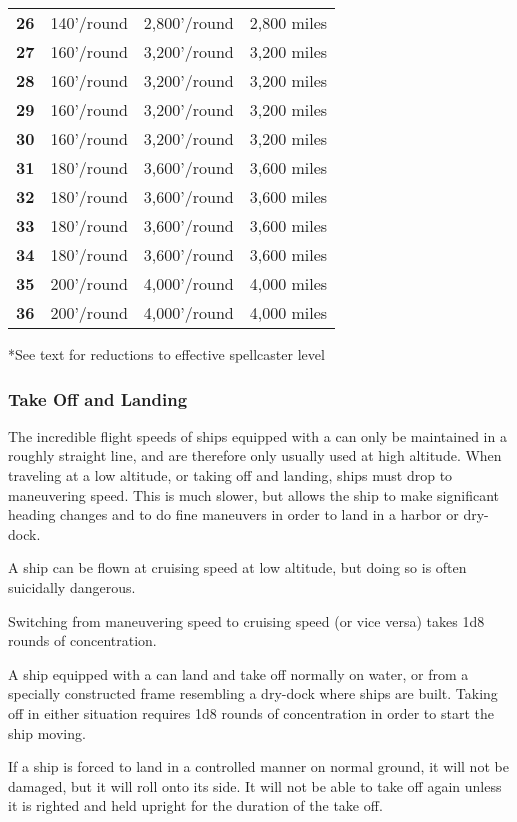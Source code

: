 \begin{multicols*}{2}
\begin {table}[H]
\begin{tabularx}{\columnwidth}{>{\bfseries}M{.8in}YYY}
	26 & 140’/round & 2,800’/round & 2,800 miles\\
	27 & 160’/round & 3,200’/round & 3,200 miles\\
	28 & 160’/round & 3,200’/round & 3,200 miles\\
	29 & 160’/round & 3,200’/round & 3,200 miles\\
	30 & 160’/round & 3,200’/round & 3,200 miles\\
	31 & 180’/round & 3,600’/round & 3,600 miles\\
	32 & 180’/round & 3,600’/round & 3,600 miles\\
	33 & 180’/round & 3,600’/round & 3,600 miles\\
	34 & 180’/round & 3,600’/round & 3,600 miles\\
	35 & 200’/round & 4,000’/round & 4,000 miles\\
	36 & 200’/round & 4,000’/round & 4,000 miles
	\end {tabularx}
	*See text for reductions to effective spellcaster level
\end {table}

\subsubsection{Take Off and Landing}
The incredible flight speeds of ships equipped with a  can only be maintained in a roughly straight line, and are therefore only usually used at high altitude. When traveling at a low altitude, or taking off and landing, ships must drop to maneuvering speed. This is much slower, but allows the ship to make significant heading changes and to do fine maneuvers in order to land in a harbor or dry-dock.

A ship can be flown at cruising speed at low altitude, but doing so is often suicidally dangerous.

Switching from maneuvering speed to cruising speed (or vice versa) takes 1d8 rounds of concentration.

A ship equipped with a  can land and take off normally on water, or from a specially constructed frame resembling a dry-dock where ships are built. Taking off in either situation requires 1d8 rounds of concentration in order to start the ship moving.

If a ship is forced to land in a controlled manner on normal ground, it will not be damaged, but it will roll onto its side. It will not be able to take off again unless it is righted and held upright for the duration of the take off.


\end{multicols*}
